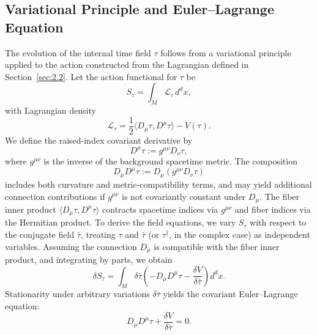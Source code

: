 \documentclass[11pt]{article}
\begin{document}
\subsection{Variational Principle and Euler--Lagrange Equation}

The evolution of the internal time field \( \tau \) follows from a variational principle applied to the action constructed from the Lagrangian defined in Section~\ref{sec:2.2}. Let the action functional for \( \tau \) be
\begin{equation}
S_\tau = \int_M \mathcal{L}_\tau \, d^dx,
\end{equation}
with Lagrangian density
\begin{equation}
\mathcal{L}_\tau = \frac{1}{2} \langle D_\mu \tau, D^\mu \tau \rangle - V(\tau). \label{eq:cov-lag}
\end{equation}
We define the raised-index covariant derivative by
\begin{equation}
D^\mu \tau := g^{\mu\nu} D_\nu \tau,
\end{equation}
where \( g^{\mu\nu} \) is the inverse of the background spacetime metric. The composition
\begin{equation}
D_\mu D^\mu \tau := D_\mu(g^{\mu\nu} D_\nu \tau)
\end{equation}
includes both curvature and metric-compatibility terms, and may yield additional connection contributions if \( g^{\mu\nu} \) is not covariantly constant under \( D_\mu \). The fiber inner product \( \langle D_\mu \tau, D^\mu \tau \rangle \) contracts spacetime indices via \( g^{\mu\nu} \) and fiber indices via the Hermitian product.
To derive the field equations, we vary \( S_\tau \) with respect to the conjugate field \( \bar{\tau} \), treating \( \tau \) and \( \bar{\tau} \) (or \( \tau^\dagger \), in the complex case) as independent variables. Assuming the connection \( D_\mu \) is compatible with the fiber inner product, and integrating by parts, we obtain
\begin{equation}
\delta S_\tau = \int_M \delta \bar{\tau} \left( - D_\mu D^\mu \tau - \frac{\delta V}{\delta \bar{\tau}} \right) d^dx.
\end{equation}
Stationarity under arbitrary variations \( \delta \bar{\tau} \) yields the covariant Euler--Lagrange equation:
\begin{equation}
D_\mu D^\mu \tau + \frac{\delta V}{\delta \bar{\tau}} = 0.
\end{equation}
\end{document}
